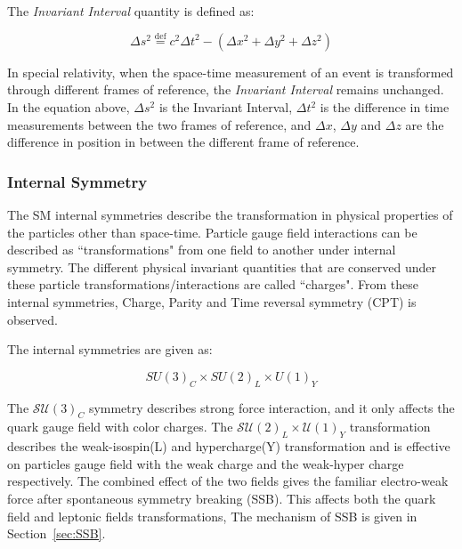     The \textit{Invariant Interval} quantity is defined as:

    \begin{equation}
        \Delta s^2 \overset{\mathrm{def}}{=} c^{2}\Delta t^{2} - (\Delta x^{2}+\Delta y^{2} + \Delta z^{2})
        \label{eq:InvariantInterval}
    \end{equation}

    In special relativity, when the space-time measurement of an event is transformed through different frames of reference, the \textit{Invariant Interval} remains unchanged. In the equation above, $\Delta s^{2}$ is the Invariant Interval, $\Delta t^{2}$ is the difference in time measurements between the two frames of reference, and $\Delta x$, $\Delta y$ and $\Delta z$ are the difference in position in between the different frame of reference.

\subsubsection{Internal Symmetry}
The SM internal symmetries describe the transformation in physical properties of the particles other than space-time. Particle gauge field interactions can be described as ``transformations" from one field to another under internal symmetry. The different physical invariant quantities that are conserved under these particle transformations/interactions are called ``charges". From these internal symmetries, Charge, Parity and Time reversal symmetry (CPT) is observed. 

The internal symmetries are given as:

\begin{equation}
    SU(3)_{C} \times SU(2)_{L} \times U(1)_{Y}
\end{equation}


    

    The $\mathcal{SU}(3)_{C}$ symmetry describes strong force interaction, and it only affects the quark gauge field with color charges. The $\mathcal{SU}(2)_{L} \times \mathcal{U}(1)_{Y}$ transformation describes the weak-isospin(L) and hypercharge(Y) transformation and is effective on particles gauge field with the weak charge and the weak-hyper charge respectively. The combined effect of the two fields gives the familiar electro-weak force after spontaneous symmetry breaking (SSB). This affects both the quark field and leptonic fields transformations, The mechanism of SSB is given in Section~\ref{sec:SSB}.

